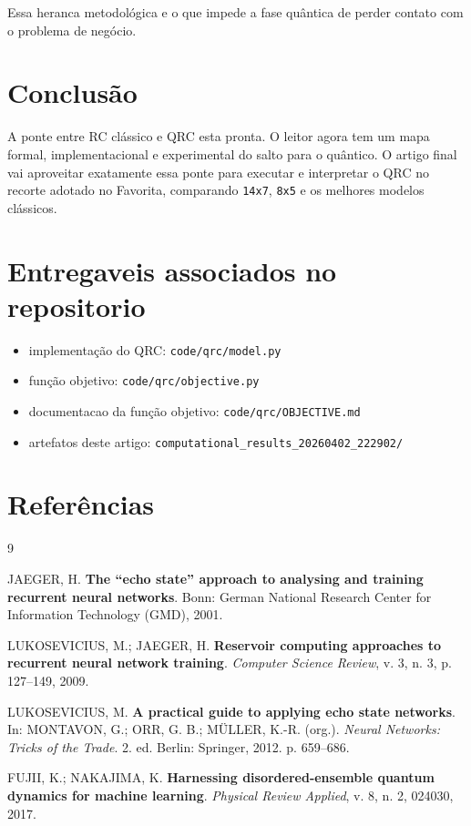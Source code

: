 \documentclass[12pt]{article}
\providecommand{\tightlist}{%
          \setlength{\itemsep}{0pt}\setlength{\parskip}{0pt}}
\begin{document}
Essa heranca metodológica e o que impede a fase quântica de perder contato com o problema de negócio.

\section{Conclusão}\label{10-conclusuxe3o}

A ponte entre RC clássico e QRC esta pronta. O leitor agora tem um mapa formal, implementacional e experimental do salto para o quântico. O artigo final vai aproveitar exatamente essa ponte para executar e interpretar o QRC no recorte adotado no Favorita, comparando \texttt{14x7}, \texttt{8x5} e os melhores modelos clássicos.

\section{Entregaveis associados no repositorio}\label{entregaveis-associados-no-repositorio}

\begin{itemize}
\tightlist
\item
  implementação do QRC: \texttt{code/qrc/model.py}
\item
  função objetivo: \texttt{code/qrc/objective.py}
\item
  documentacao da função objetivo: \texttt{code/qrc/OBJECTIVE.md}
\item
  artefatos deste artigo: \texttt{computational\_results\_20260402\_222902/}
\end{itemize}

\section{Referências}\label{referencias}

\begin{thebibliography}{9}

JAEGER, H. \textbf{The ``echo state'' approach to analysing and training recurrent neural networks}. Bonn: German National Research Center for Information Technology (GMD), 2001.

LUKOSEVICIUS, M.; JAEGER, H. \textbf{Reservoir computing approaches to recurrent neural network training}. \emph{Computer Science Review}, v. 3, n. 3, p. 127--149, 2009.

LUKOSEVICIUS, M. \textbf{A practical guide to applying echo state networks}. In: MONTAVON, G.; ORR, G. B.; MÜLLER, K.-R. (org.). \emph{Neural Networks: Tricks of the Trade}. 2. ed. Berlin: Springer, 2012. p. 659--686.

FUJII, K.; NAKAJIMA, K. \textbf{Harnessing disordered-ensemble quantum dynamics for machine learning}. \emph{Physical Review Applied}, v. 8, n. 2, 024030, 2017.

\end{thebibliography}

        
\end{document}
